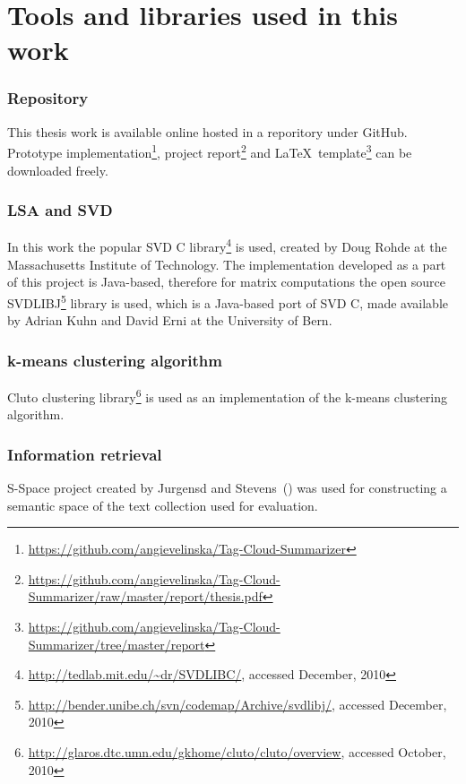 \section{Tools and libraries used in this work}
\label{sec:implementation:tools_used}

\subsubsection{Repository}
This thesis work is available online hosted in a reporitory under GitHub. Prototype implementation\footnote{\url{https://github.com/angievelinska/Tag-Cloud-Summarizer}}, project report\footnote{\url{https://github.com/angievelinska/Tag-Cloud-Summarizer/raw/master/report/thesis.pdf}} and \LaTeX~template\footnote{\url{https://github.com/angievelinska/Tag-Cloud-Summarizer/tree/master/report}} can be downloaded freely. \\

\subsubsection{LSA and SVD}
In this work the popular SVD C library\footnote{\url{http://tedlab.mit.edu/~dr/SVDLIBC/}, accessed December, 2010}  is used, created by Doug Rohde at the Massachusetts Institute of Technology. The implementation developed as a part of this project is Java-based, therefore for matrix computations the open source SVDLIBJ\footnote{\url{http://bender.unibe.ch/svn/codemap/Archive/svdlibj/}, accessed December, 2010} library is used, which is a Java-based port of SVD C, made available by Adrian Kuhn and David Erni at the University of Bern. \\

\subsubsection{k-means clustering algorithm}
Cluto clustering library\footnote{\url{http://glaros.dtc.umn.edu/gkhome/cluto/cluto/overview}, accessed October, 2010} is used as an implementation of the k-means clustering algorithm.\\

\subsubsection{Information retrieval}
S-Space project created by  Jurgensd and Stevens~(\cite{S-Space}) was used for constructing a semantic space of the text collection used for evaluation. \\

